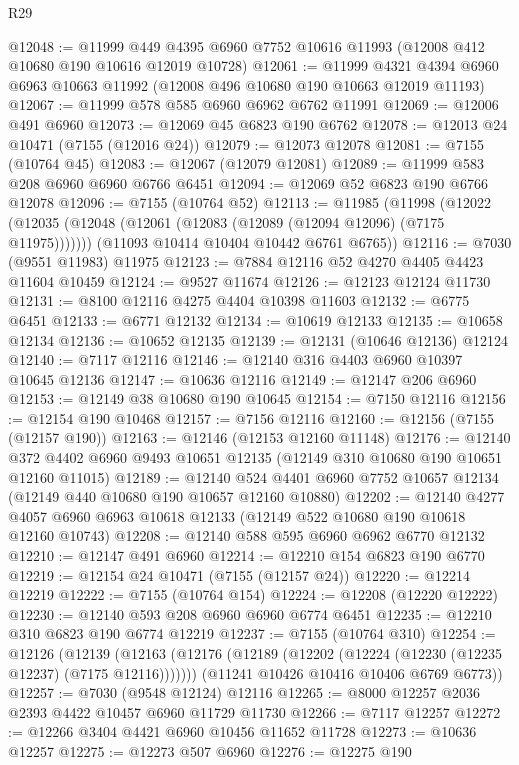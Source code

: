 \begin{lexlean}{R29}
\begin{coremodule}
@12048 := @11999 @449 @4395 @6960 @7752 @10616 @11993 (@12008 @412 @10680 @190 @10616 @12019 @10728)
@12061 := @11999
    @4321
    @4394
    @6960
    @6963
    @10663
    @11992
    (@12008 @496 @10680 @190 @10663 @12019 @11193)
@12067 := @11999 @578 @585 @6960 @6962 @6762 @11991
@12069 := @12006 @491 @6960
@12073 := @12069 @45 @6823 @190 @6762
@12078 := @12013 @24 @10471 (@7155 (@12016 @24))
@12079 := @12073 @12078
@12081 := @7155 (@10764 @45)
@12083 := @12067 (@12079 @12081)
@12089 := @11999 @583 @208 @6960 @6960 @6766 @6451
@12094 := @12069 @52 @6823 @190 @6766 @12078
@12096 := @7155 (@10764 @52)
@12113 := @11985
    (@11998
      (@12022 (@12035 (@12048 (@12061 (@12083 (@12089 (@12094 @12096) (@7175 @11975)))))))
      (@11093 @10414 @10404 @10442 @6761 @6765))
@12116 := @7030 (@9551 @11983) @11975
@12123 := @7884 @12116 @52 @4270 @4405 @4423 @11604 @10459
@12124 := @9527 @11674
@12126 := @12123 @12124 @11730
@12131 := @8100 @12116 @4275 @4404 @10398 @11603
@12132 := @6775 @6451
@12133 := @6771 @12132
@12134 := @10619 @12133
@12135 := @10658 @12134
@12136 := @10652 @12135
@12139 := @12131 (@10646 @12136) @12124
@12140 := @7117 @12116
@12146 := @12140 @316 @4403 @6960 @10397 @10645 @12136
@12147 := @10636 @12116
@12149 := @12147 @206 @6960
@12153 := @12149 @38 @10680 @190 @10645
@12154 := @7150 @12116
@12156 := @12154 @190 @10468
@12157 := @7156 @12116
@12160 := @12156 (@7155 (@12157 @190))
@12163 := @12146 (@12153 @12160 @11148)
@12176 := @12140 @372 @4402 @6960 @9493 @10651 @12135 (@12149 @310 @10680 @190 @10651 @12160 @11015)
@12189 := @12140 @524 @4401 @6960 @7752 @10657 @12134 (@12149 @440 @10680 @190 @10657 @12160 @10880)
@12202 := @12140
    @4277
    @4057
    @6960
    @6963
    @10618
    @12133
    (@12149 @522 @10680 @190 @10618 @12160 @10743)
@12208 := @12140 @588 @595 @6960 @6962 @6770 @12132
@12210 := @12147 @491 @6960
@12214 := @12210 @154 @6823 @190 @6770
@12219 := @12154 @24 @10471 (@7155 (@12157 @24))
@12220 := @12214 @12219
@12222 := @7155 (@10764 @154)
@12224 := @12208 (@12220 @12222)
@12230 := @12140 @593 @208 @6960 @6960 @6774 @6451
@12235 := @12210 @310 @6823 @190 @6774 @12219
@12237 := @7155 (@10764 @310)
@12254 := @12126
    (@12139
      (@12163 (@12176 (@12189 (@12202 (@12224 (@12230 (@12235 @12237) (@7175 @12116)))))))
      (@11241 @10426 @10416 @10406 @6769 @6773))
@12257 := @7030 (@9548 @12124) @12116
@12265 := @8000 @12257 @2036 @2393 @4422 @10457 @6960 @11729 @11730
@12266 := @7117 @12257
@12272 := @12266 @3404 @4421 @6960 @10456 @11652 @11728
@12273 := @10636 @12257
@12275 := @12273 @507 @6960
@12276 := @12275 @190

\end{coremodule}
\end{lexlean}
